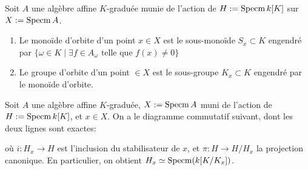 \begin{defn}
Soit $A$ une algèbre affine $K$-graduée munie de l'action de $H:=\operatorname{Specm} k[K]$ sur $X:=\operatorname{Specm} A$.
\begin{enumerate}
\item Le monoïde d'orbite d'un point $x\in X$ est le sous-monoïde $S_x\subset K$ engendré par $\lbrace\omega \in K\mid \exists f\in A_{\omega} \textrm{ telle que } f(x)\neq 0\rbrace$
\item Le groupe d'orbite d'un point $\in X$ est le sous-groupe $K_x\subset K$ engendré par le monoïde d'orbite.
\end{enumerate}
\end{defn}

\begin{prop}
Soit $A$ une algèbre affine $K$-graduée, $X:=\operatorname{Specm} A$ muni de l'action de $H:=\operatorname{Specm} k[K]$, et $x\in X$. On a le diagramme commutatif suivant, dont les deux lignes sont exactes:
	\begin{center}
	\end{center}
	où $i:H_x\rightarrow H$ est l'inclusion du stabilisateur de $x$, et $\pi:H\rightarrow H/H_x$ la projection canonique. En particulier, on obtient $H_x\simeq \operatorname{Specm}(k[K/K_x])$.
\end{prop}
